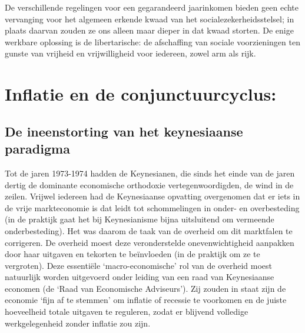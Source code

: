 \documentclass[
  a5paper,
  smalldemyvopaper,10pt,twoside,onecolumn,openright,extrafontsizes,hidelinks]{memoir}
\begin{document}
De verschillende regelingen voor een gegarandeerd jaarinkomen bieden
geen echte vervanging voor het algemeen erkende kwaad van het
socialezekerheidsstelsel; in plaats daarvan zouden ze ons alleen maar
dieper in dat kwaad storten. De enige werkbare oplossing is de
libertarische: de afschaffing van sociale voorzieningen ten gunste van
vrijheid en vrijwilligheid voor iedereen, zowel arm als rijk.


\chapter{Inflatie en de
conjunctuurcyclus:}\label{inflatie-en-de-conjunctuurcyclus}

\section{De ineenstorting van het keynesiaanse
paradigma}\label{de-ineenstorting-van-het-keynesiaanse-paradigma}

Tot de jaren 1973-1974 hadden de Keynesianen, die sinds het einde van de
jaren dertig de dominante economische orthodoxie vertegenwoordigden, de
wind in de zeilen. Vrijwel iedereen had de Keynesiaanse opvatting
overgenomen dat er iets in de vrije markteconomie is dat leidt tot
schommelingen in onder- en overbesteding (in de praktijk gaat het bij
Keynesianisme bijna uitsluitend om vermeende onderbesteding). Het was
daarom de taak van de overheid om dit marktfalen te corrigeren. De
overheid moest deze veronderstelde onevenwichtigheid aanpakken door haar
uitgaven en tekorten te beïnvloeden (in de praktijk om ze te vergroten).
Deze essentiële `macro-economische' rol van de overheid moest natuurlijk
worden uitgevoerd onder leiding van een raad van Keynesiaanse economen
(de `Raad van Economische Adviseurs'). Zij zouden in staat zijn de
economie `fijn af te stemmen' om inflatie of recessie te voorkomen en de
juiste hoeveelheid totale uitgaven te reguleren, zodat er blijvend
volledige werkgelegenheid zonder inflatie zou zijn.
\end{document}
